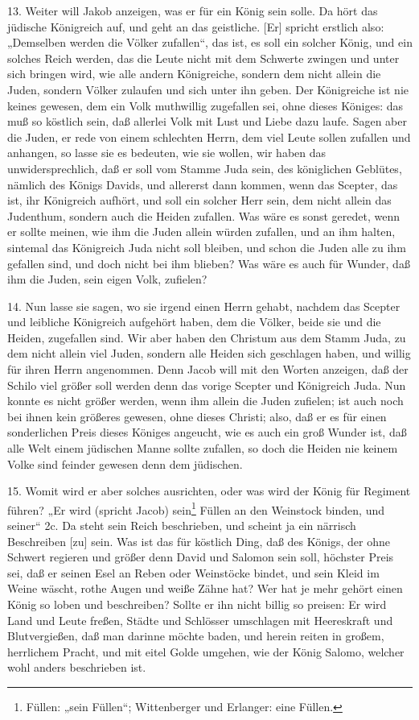 13. Weiter will Jakob anzeigen, was er für ein König sein solle. Da hört das jüdische Königreich auf, und geht an das geistliche. [Er] spricht erstlich also: „Demselben werden die Völker zufallen“, das ist, es soll ein solcher König, und ein solches Reich werden, das die Leute nicht mit dem Schwerte zwingen und unter sich bringen wird, wie alle andern Königreiche, sondern dem nicht allein die Juden, sondern Völker zulaufen und sich unter ihn geben. Der Königreiche ist nie keines gewesen, dem ein Volk muthwillig zugefallen sei, ohne dieses Königes: das muß so köstlich sein, daß allerlei Volk mit Lust und Liebe dazu laufe. Sagen aber die Juden, er rede von einem schlechten Herrn, dem viel Leute
sollen zufallen und anhangen, so lasse sie es bedeuten, wie sie wollen, wir haben das unwidersprechlich, daß er soll vom Stamme Juda sein, des königlichen Geblütes, nämlich des Königs Davids, und allererst dann kommen, wenn das Scepter, das ist, ihr Königreich aufhört, und soll ein solcher Herr sein, dem nicht allein das Judenthum, sondern auch die Heiden zufallen. Was wäre es sonst geredet, wenn er sollte meinen, wie ihm die Juden allein würden zufallen, und an ihm halten, sintemal das Königreich Juda nicht soll bleiben, und schon die Juden alle zu ihm gefallen sind, und doch nicht bei ihm blieben? Was wäre es auch für Wunder, daß ihm die Juden, sein eigen Volk, zufielen?

14. Nun lasse sie sagen, wo sie irgend einen Herrn gehabt, nachdem das Scepter und leibliche Königreich aufgehört haben, dem die Völker, beide sie und die Heiden, zugefallen sind. Wir aber haben den Christum aus dem Stamm Juda, zu dem nicht allein viel Juden, sondern alle Heiden sich geschlagen haben, und willig für ihren Herrn angenommen. Denn Jacob will mit den Worten anzeigen, daß der Schilo viel größer soll werden denn das vorige Scepter und Königreich Juda. Nun konnte es nicht größer werden, wenn ihm allein die Juden zufielen; ist auch noch bei ihnen kein größeres gewesen, ohne dieses Christi; also, daß er es für einen sonderlichen Preis dieses Königes angeucht, wie es auch ein groß Wunder ist, daß alle Welt einem jüdischen Manne sollte zufallen, so doch die Heiden nie keinem Volke sind feinder gewesen denn dem jüdischen.

15. Womit wird er aber solches ausrichten, oder was wird der König für Regiment führen? „Er wird (spricht Jacob) sein\footnote{Füllen: „sein Füllen“; Wittenberger und Erlanger: eine Füllen.} Füllen an den Weinstock binden, und seiner“ 2c. Da steht sein Reich beschrieben, und scheint ja ein närrisch Beschreiben [zu] sein. Was ist das für köstlich Ding, daß des Königs, der ohne Schwert regieren und größer denn David und Salomon sein soll, höchster Preis sei, daß er seinen Esel an Reben oder Weinstöcke bindet, und sein Kleid im Weine wäscht, rothe Augen und weiße Zähne hat? Wer hat je mehr gehört einen König so loben und beschreiben? Sollte er ihn nicht billig so preisen: Er wird Land und Leute freßen, Städte und Schlösser umschlagen mit Heereskraft und Blutvergießen, daß man darinne möchte baden, und herein reiten in großem, herrlichem Pracht, und mit eitel Golde umgehen, wie der König Salomo, welcher wohl anders beschrieben ist.

